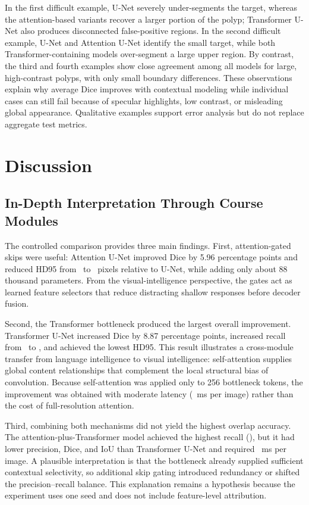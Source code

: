 \documentclass[a4paper,10pt]{article}
\begin{document}
In the first difficult example, U-Net severely under-segments the target, whereas the attention-based variants recover a larger portion of the polyp; Transformer U-Net also produces disconnected false-positive regions. In the second difficult example, U-Net and Attention U-Net identify the small target, while both Transformer-containing models over-segment a large upper region. By contrast, the third and fourth examples show close agreement among all models for large, high-contrast polyps, with only small boundary differences. These observations explain why average Dice improves with contextual modeling while individual cases can still fail because of specular highlights, low contrast, or misleading global appearance. Qualitative examples support error analysis but do not replace aggregate test metrics.
\FloatBarrier
{}
\section{Discussion}
\label{sec:discussion}

\subsection{In-Depth Interpretation Through Course Modules}

The controlled comparison provides three main findings. First, attention-gated skips were useful: Attention U-Net improved Dice by 5.96 percentage points and reduced HD95 from \UNetHD~to \AttentionUNetHD~pixels relative to U-Net, while adding only about 88 thousand parameters. From the visual-intelligence perspective, the gates act as learned feature selectors that reduce distracting shallow responses before decoder fusion.

Second, the Transformer bottleneck produced the largest overall improvement. Transformer U-Net increased Dice by 8.87 percentage points, increased recall from \UNetRecall~to \TransformerUNetRecall, and achieved the lowest HD95. This result illustrates a cross-module transfer from language intelligence to visual intelligence: self-attention supplies global content relationships that complement the local structural bias of convolution. Because self-attention was applied only to 256 bottleneck tokens, the improvement was obtained with moderate latency (\TransformerUNetLatency~ms per image) rather than the cost of full-resolution attention.

Third, combining both mechanisms did not yield the highest overlap accuracy. The attention-plus-Transformer model achieved the highest recall (\ProposedRecall), but it had lower precision, Dice, and IoU than Transformer U-Net and required \ProposedLatency~ms per image. A plausible interpretation is that the bottleneck already supplied sufficient contextual selectivity, so additional skip gating introduced redundancy or shifted the precision--recall balance. This explanation remains a hypothesis because the experiment uses one seed and does not include feature-level attribution.
\end{document}
